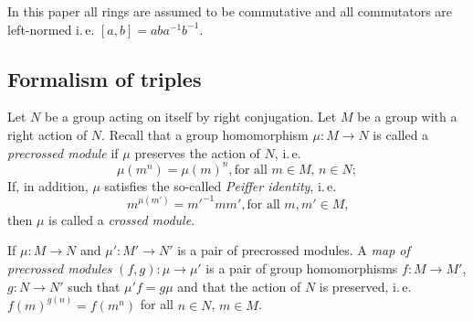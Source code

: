In this paper all rings are assumed to be commutative and all commutators are left-normed i.\,e. $[a, b] = a b a^{-1} b^{-1}$.

\subsection{Formalism of triples}\label{subsec:triples}

Let $N$ be a group acting on itself by right conjugation.
Let $M$ be a group with a right action of $N$.
Recall that a group homomorphism $\mu\colon M \to N$ is called a \textit{precrossed module} if $\mu$ preserves the action of $N$, i.\,e.
\[\mu(m^n) = \mu(m)^n, \text{for all $m \in M$, $n\in N;$} \]
If, in addition, $\mu$ satisfies the so-called \textit{Peiffer identity}, i.\,e.
\[{m}^{\mu(m')} = {m'}^{-1} m m', \text{for all $m, m' \in M$,}\]
then $\mu$ is called a \textit{crossed module}.

If $\mu\colon M \to N$ and $\mu' \colon M' \to N'$ is a pair of precrossed modules.
A \textit{map of precrossed modules} $(f, g)\colon \mu \to \mu'$ is a pair of group homomorphisms $f\colon M \to M'$, $g\colon N \to N'$ such that
$\mu'f = g \mu$ and that the action of $N$ is preserved, i.\,e. ${f(m)}^{g(n)} = f(m^n)$ for all $n \in N$, $m \in M$.

